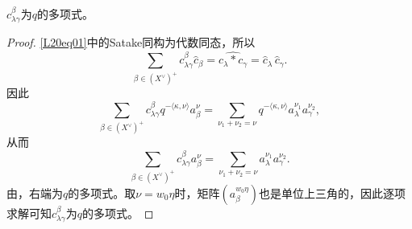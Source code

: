 \begin{corollary}\label{L20S1O5}$c^\beta_{\lambda\gamma}$为$q$的多项式。\end{corollary}
\begin{proof}
\eqref{L20eq01}中的Satake同构为代数同态，所以
\[\sum_{\beta\in(X^\vee)^+}c^\beta_{\lambda\gamma}\widehat c_\beta=\widehat{c_\lambda*c_\gamma}=\widehat c_\lambda\,\widehat c_\gamma.\]
因此
\[\sum_{\beta\in(X^\vee)^+}c^\beta_{\lambda\gamma}q^{-\langle\kappa,\nu\rangle}a^\nu_\beta=\sum_{\nu_1+\nu_2=\nu}q^{-\langle\kappa,\nu\rangle}a^{\nu_1}_\lambda a^{\nu_2}_\gamma,\]
从而
\[\sum_{\beta\in(X^\vee)^+}c^\beta_{\lambda\gamma}a^\nu_\beta=\sum_{\nu_1+\nu_2=\nu}a^{\nu_1}_\lambda a^{\nu_2}_\gamma.\]
由，右端为$q$的多项式。取$\nu=w_0\eta$时，矩阵$(a^{w_0\eta}_\beta)$也是单位上三角的，因此逐项求解可知$c^\beta_{\lambda\gamma}$为$q$的多项式。
\end{proof}

